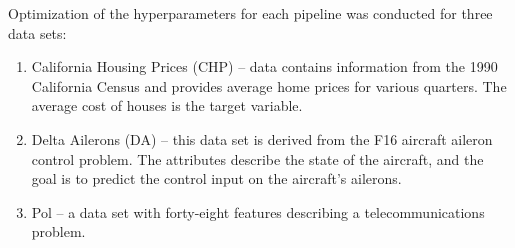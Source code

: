 \documentclass[iicol]{sn-jnl}
\theoremstyle{thmstyleone}%
\theoremstyle{thmstyletwo}%
\theoremstyle{thmstylethree}%
\begin{document}
Optimization of the hyperparameters for each pipeline was conducted for three data sets:
\begin{enumerate}
    \item California Housing Prices (CHP) -- data contains information from the 1990 California Census and provides average home prices for various quarters. The average cost of houses is the target variable.
    \item Delta Ailerons (DA) -- this data set is derived from the F16 aircraft aileron control problem. The attributes describe the state of the aircraft, and the goal is to predict the control input on the aircraft's ailerons.
    \item Pol -- a data set with forty-eight features describing a telecommunications problem.
\end{enumerate}
\end{document}
